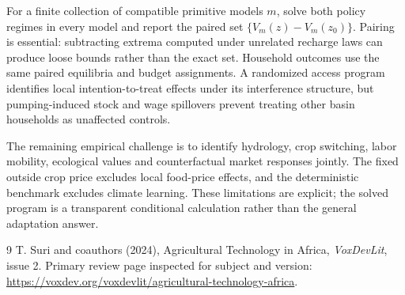 \documentclass[11pt]{article}
\begin{document}
For a finite collection of compatible primitive models $m$, solve both policy regimes in every model and report the paired set $\{V_m(z)-V_m(z_0)\}$. Pairing is essential: subtracting extrema computed under unrelated recharge laws can produce loose bounds rather than the exact set. Household outcomes use the same paired equilibria and budget assignments. A randomized access program identifies local intention-to-treat effects under its interference structure, but pumping-induced stock and wage spillovers prevent treating other basin households as unaffected controls.

The remaining empirical challenge is to identify hydrology, crop switching, labor mobility, ecological values and counterfactual market responses jointly. The fixed outside crop price excludes local food-price effects, and the deterministic benchmark excludes climate learning. These limitations are explicit; the solved program is a transparent conditional calculation rather than the general adaptation answer.

\begin{thebibliography}{9}
 T. Suri and coauthors (2024), Agricultural Technology in Africa, \emph{VoxDevLit}, issue 2. Primary review page inspected for subject and version: \url{https://voxdev.org/voxdevlit/agricultural-technology-africa}.
\end{thebibliography}
\end{document}
